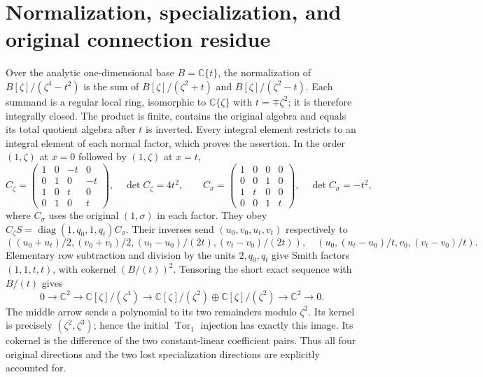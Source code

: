 \documentclass[11pt]{article}
\newcommand{\C}{\mathbb C}\newcommand{\diag}{\operatorname{diag}}
\begin{document}
\section{Normalization, specialization, and original connection residue}
Over the analytic one-dimensional base $B=\C\{t\}$, the normalization of
$B[\zeta]/(\zeta^4-t^2)$ is the sum of
$B[\zeta]/(\zeta^2+t)$ and $B[\zeta]/(\zeta^2-t)$.
Each summand is a regular local ring, isomorphic to $\C\{\zeta\}$ with
$t=\mp\zeta^2$; it is therefore integrally closed. The product is finite,
contains the original algebra and equals its total quotient algebra
after $t$ is inverted. Every integral element restricts to an integral
element of each normal factor, which proves the assertion.
In the order $(1,\zeta)$ at $x=0$ followed by $(1,\zeta)$ at $x=t$,
\begin{equation}
 C_\zeta=\begin{pmatrix}1&0&-t&0\\0&1&0&-t\\
 1&0&t&0\\0&1&0&t\end{pmatrix},\quad\det C_\zeta=4t^2,
 \qquad
 C_\sigma=\begin{pmatrix}1&0&0&0\\0&0&1&0\\
 1&t&0&0\\0&0&1&t\end{pmatrix},\quad\det C_\sigma=-t^2,
 \tag{ECC12}
\end{equation}
where $C_\sigma$ uses the original $(1,\sigma)$ in each factor.
They obey $C_\zeta S=\diag(1,q_0,1,q_t)C_\sigma$.
Their inverses send $(u_0,v_0,u_t,v_t)$ respectively to
\begin{equation}
 \left((u_0+u_t)/2,(v_0+v_t)/2,(u_t-u_0)/(2t),(v_t-v_0)/(2t)\right),
 \quad
 \left(u_0,(u_t-u_0)/t,v_0,(v_t-v_0)/t\right).
 \tag{ECC13}
\end{equation}
Elementary row subtraction and division by the units $2,q_0,q_t$
give Smith factors $(1,1,t,t)$, with cokernel $(B/(t))^2$.
Tensoring the short exact sequence with $B/(t)$ gives
\begin{equation}
 0\to\C^2\to\C[\zeta]/(\zeta^4)
 \to\C[\zeta]/(\zeta^2)\oplus\C[\zeta]/(\zeta^2)
 \to\C^2\to0.
 \tag{ECC14}
\end{equation}
The middle arrow sends a polynomial to its two remainders modulo
$\zeta^2$. Its kernel is precisely $(\zeta^2,\zeta^3)$; hence the initial
$\operatorname{Tor}_1$ injection has exactly this image. Its cokernel is
the difference of the two constant-linear coefficient pairs. Thus all
four original directions and the two lost specialization directions
are explicitly accounted for.
\end{document}
